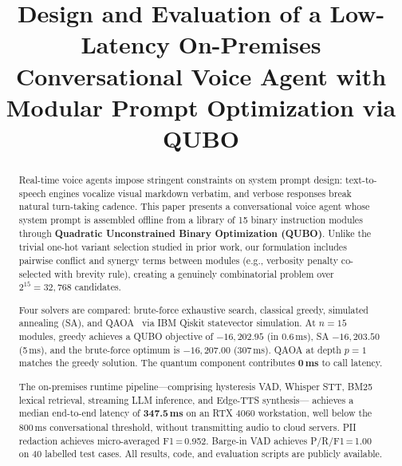 \documentclass[journal]{IEEEtran}
\begin{document}
\title{Design and Evaluation of a Low-Latency On-Premises Conversational Voice
Agent with Modular Prompt Optimization via QUBO}

\author{
    \and
}

\maketitle

\begin{abstract}
Real-time voice agents impose stringent constraints on system prompt design:
text-to-speech engines vocalize visual markdown verbatim, and verbose responses
break natural turn-taking cadence. This paper presents a conversational voice
agent whose system prompt is assembled offline from a library of 15 binary
instruction modules through \textbf{Quadratic Unconstrained Binary Optimization
(QUBO)}. Unlike the trivial one-hot variant selection studied in prior work,
our formulation includes pairwise conflict and synergy terms between modules
(e.g., verbosity penalty co-selected with brevity rule), creating a genuinely
combinatorial problem over $2^{15} = 32{,}768$ candidates.

Four solvers are compared: brute-force exhaustive search, classical greedy,
simulated annealing (SA), and QAOA~\cite{farhi2014} via IBM Qiskit statevector simulation.
At $n{=}15$ modules, greedy achieves a QUBO objective of $-16{,}202.95$
(in 0.6\,ms), SA $-16{,}203.50$ (5\,ms), and the brute-force optimum is
$-16{,}207.00$ (307\,ms). QAOA at depth $p{=}1$ matches the greedy solution.
The quantum component contributes \textbf{0\,ms} to call latency.

The on-premises runtime pipeline---comprising hysteresis VAD, Whisper STT,
BM25 lexical retrieval, streaming LLM inference, and Edge-TTS synthesis---
achieves a median end-to-end latency of \textbf{347.5\,ms} on an RTX 4060
workstation, well below the 800\,ms conversational threshold, without
transmitting audio to cloud servers. PII redaction achieves micro-averaged
F1\,=\,0.952. Barge-in VAD achieves P/R/F1\,=\,1.00 on 40 labelled test
cases. All results, code, and evaluation scripts are publicly available.
\end{abstract}
\end{document}
